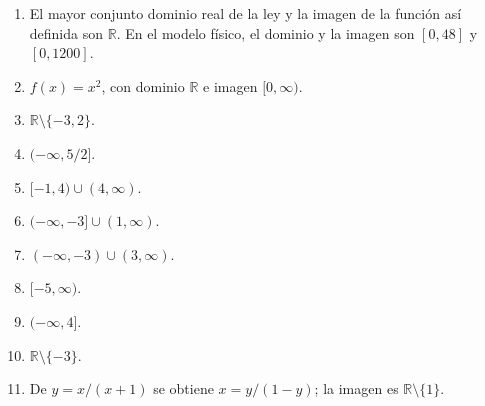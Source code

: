 \ifmostrarSoluciones
\begin{solucion}
\begin{enumerate}
  \item El mayor conjunto dominio real de la ley y la imagen de la función así definida son $\mathbb{R}$. En el modelo físico, el dominio y la imagen son $[0,48]$ y $[0,1200]$.
  \item $f(x)=x^2$, con dominio $\mathbb{R}$ e imagen $[0,\infty)$.
  \item $\mathbb{R}\setminus\{-3,2\}$.
  \item $(-\infty,5/2]$.
  \item $[-1,4)\cup(4,\infty)$.
  \item $(-\infty,-3]\cup(1,\infty)$.
  \item $(-\infty,-3)\cup(3,\infty)$.
  \item $[-5,\infty)$.
  \item $(-\infty,4]$.
  \item $\mathbb{R}\setminus\{-3\}$.
  \item De $y=x/(x+1)$ se obtiene $x=y/(1-y)$; la imagen es $\mathbb{R}\setminus\{1\}$.
\end{enumerate}
\end{solucion}
\fi

\ifdefined\documentoSemanal
\else

\fi
